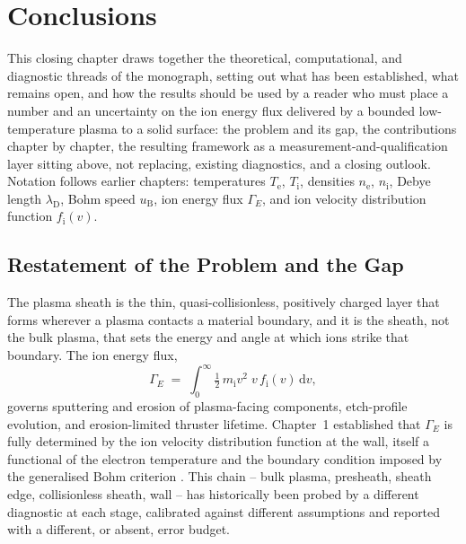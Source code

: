 \chapter{Conclusions}
\label{ch:conclusion}

This closing chapter draws together the theoretical, computational, and diagnostic threads of the monograph, setting out what has been established, what remains open, and how the results should be used by a reader who must place a number and an uncertainty on the ion energy flux delivered by a bounded low-temperature plasma to a solid surface: the problem and its gap, the contributions chapter by chapter, the resulting framework as a measurement-and-qualification layer sitting above, not replacing, existing diagnostics, and a closing outlook. Notation follows earlier chapters: temperatures $T_{\mathrm{e}}$, $T_{\mathrm{i}}$, densities $n_{\mathrm{e}}$, $n_{\mathrm{i}}$, Debye length $\lambda_{\mathrm{D}}$, Bohm speed $u_{\mathrm{B}}$, ion energy flux $\Gamma_{E}$, and ion velocity distribution function $f_{\mathrm{i}}(v)$.

\section{Restatement of the Problem and the Gap}
\label{sec:conclusion-restatement}

The plasma sheath is the thin, quasi-collisionless, positively charged layer that forms wherever a plasma contacts a material boundary, and it is the sheath, not the bulk plasma, that sets the energy and angle at which ions strike that boundary. The ion energy flux,
\begin{equation}
\Gamma_{E} \;=\; \int_{0}^{\infty} \tfrac{1}{2}\, m_{\mathrm{i}} v^{2} \; v\, f_{\mathrm{i}}(v)\, \mathrm{d}v ,
\label{eq:conclusion-GammaE-def}
\end{equation}
governs sputtering and erosion of plasma-facing components, etch-profile evolution, and erosion-limited thruster lifetime. Chapter~1 established that $\Gamma_{E}$ is fully determined by the ion velocity distribution function at the wall, itself a functional of the electron temperature and the boundary condition imposed by the generalised Bohm criterion \cite{ref0001,ref0013}. This chain -- bulk plasma, presheath, sheath edge, collisionless sheath, wall -- has historically been probed by a different diagnostic at each stage, calibrated against different assumptions and reported with a different, or absent, error budget.

